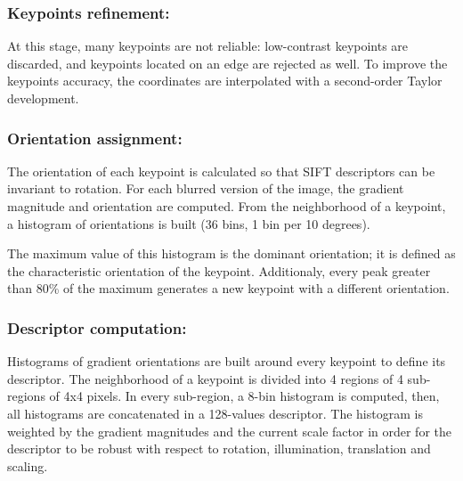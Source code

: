 \documentclass[preprint]{iucr}
\begin{document}
\subsubsection{Keypoints refinement:}

At this stage, many keypoints are not reliable: low-contrast keypoints are
discarded, and keypoints located on an edge are rejected as well.  
To improve the keypoints accuracy, the coordinates are interpolated with a
second-order Taylor development. 


\subsubsection{Orientation assignment:}
The orientation of each keypoint is calculated  so that SIFT descriptors
can be invariant to rotation. 
For each blurred version of the image, the gradient magnitude and orientation
are computed. 
From the neighborhood of a keypoint, a histogram of orientations is built (36
bins, 1 bin per 10 degrees). 

The maximum value of this histogram is the dominant orientation; it is defined
as the characteristic orientation of the keypoint. 
Additionaly, every peak greater than 80\% of the maximum generates a new
keypoint with a different orientation. 



\subsubsection{Descriptor computation:}
Histograms of gradient orientations are built around every keypoint to define
its descriptor.
The neighborhood of a keypoint is divided into 4 regions of 4 sub-regions of 4x4
pixels.
In every sub-region, a 8-bin histogram is computed, then, all histograms
are concatenated in a 128-values descriptor. 
The histogram is weighted by the gradient magnitudes and the current scale
factor in order for the descriptor to be robust with respect to rotation,
illumination, translation and scaling.  
\end{document}
